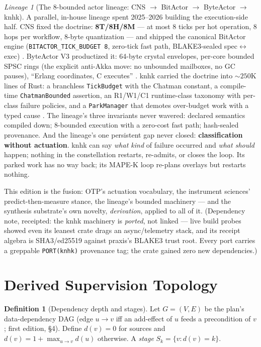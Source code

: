 \documentclass[11pt,a4paper]{article}
\theoremstyle{definition}
\newtheorem{definition}[theorem]{Definition}
\theoremstyle{remark}
\newtheorem{lineage}[theorem]{Lineage}
\newcommand{\Dag}{G}
\begin{document}
\begin{lineage}[The 8-bounded actor lineage: CNS $\to$ BitActor $\to$ ByteActor $\to$ knhk]
A parallel, in-house lineage spent 2025--2026 building the execution-side
half. CNS fixed the doctrine: \textbf{8T/8H/8M} --- at most 8 ticks per
hot operation, 8 hops per workflow, 8-byte quantization --- and shipped
the canonical BitActor engine (\texttt{BITACTOR\_TICK\_BUDGET 8},
zero-tick fast path, BLAKE3-sealed spec$\leftrightarrow$exec)
\cite{bitactor}. ByteActor V3 productized it: 64-byte crystal envelopes,
per-core bounded SPSC rings (the explicit anti-Akka move: no unbounded
mailboxes, no GC pauses), ``Erlang coordinates, C executes''
\cite{byteactor}. knhk carried the doctrine into ${\sim}250$K lines of
Rust: a branchless \texttt{TickBudget} with the Chatman constant, a
compile-time \texttt{ChatmanBounded} assertion, an R1/W1/C1 runtime-class
taxonomy with per-class failure policies, and a \texttt{ParkManager} that
demotes over-budget work with a typed cause \cite{knhk}. The lineage's
three invariants never wavered: declared semantics compiled down;
8-bounded execution with a zero-cost fast path; hash-sealed provenance.
And the lineage's one persistent gap never closed: \textbf{classification
without actuation}. knhk can say \emph{what kind} of failure occurred and
\emph{what should} happen; nothing in the constellation restarts,
re-admits, or closes the loop. Its parked work has no way back; its MAPE-K
loop re-plans overlays but restarts nothing.
\end{lineage}

This edition is the fusion: OTP's actuation vocabulary, the instrument
sciences' predict-then-measure stance, the lineage's bounded machinery ---
and the synthesis substrate's own novelty, \emph{derivation}, applied to
all of it. (Dependency note, receipted: the knhk machinery is
\emph{ported}, not linked --- live build probes showed even its leanest
crate drags an async/telemetry stack, and its receipt algebra is
SHA3/ed25519 against praxis's BLAKE3 trust root. Every port carries a
greppable \texttt{PORT(knhk)} provenance tag; the crate gained zero new
dependencies.)

\section{Derived Supervision Topology}

\begin{definition}[Dependency depth and stages]
Let $\Dag = (V, E)$ be the plan's data-dependency DAG (edge $u \to v$ iff
an add-effect of $u$ feeds a precondition of $v$; first edition, \S4).
Define $d(v) = 0$ for sources and $d(v) = 1 + \max_{u \to v} d(u)$
otherwise. A \emph{stage} $S_k = \{v : d(v) = k\}$.
\end{definition}
\end{document}
